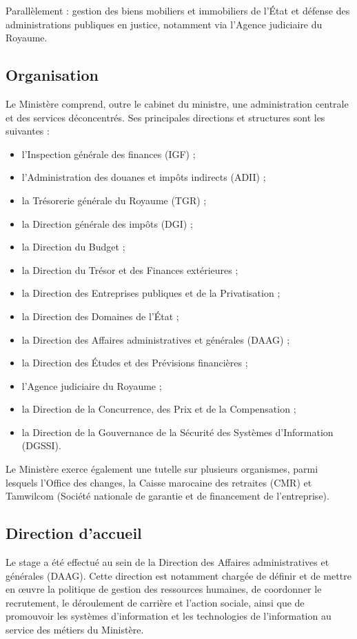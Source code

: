 \begin{onehalfspace}
Parallèlement : gestion des biens mobiliers et immobiliers de l'État et défense des administrations publiques en justice, notamment via l'Agence judiciaire du Royaume.

\subsection{Organisation}

Le Ministère comprend, outre le cabinet du ministre, une administration centrale et des services déconcentrés. Ses principales directions et structures sont les suivantes :

\begin{itemize}
  \item l'Inspection générale des finances (IGF) ;
  \item l'Administration des douanes et impôts indirects (ADII) ;
  \item la Trésorerie générale du Royaume (TGR) ;
  \item la Direction générale des impôts (DGI) ;
  \item la Direction du Budget ;
  \item la Direction du Trésor et des Finances extérieures ;
  \item la Direction des Entreprises publiques et de la Privatisation ;
  \item la Direction des Domaines de l'État ;
  \item la Direction des Affaires administratives et générales (DAAG) ;
  \item la Direction des Études et des Prévisions financières ;
  \item l'Agence judiciaire du Royaume ;
  \item la Direction de la Concurrence, des Prix et de la Compensation ;
  \item la Direction de la Gouvernance de la Sécurité des Systèmes d'Information (DGSSI).
\end{itemize}

Le Ministère exerce également une tutelle sur plusieurs organismes, parmi lesquels l'Office des changes, la Caisse marocaine des retraites (CMR) et Tamwilcom (Société nationale de garantie et de financement de l'entreprise).

\subsection{Direction d'accueil}

Le stage a été effectué au sein de la Direction des Affaires administratives et générales (DAAG). Cette direction est notamment chargée de définir et de mettre en œuvre la politique de gestion des ressources humaines, de coordonner le recrutement, le déroulement de carrière et l'action sociale, ainsi que de promouvoir les systèmes d'information et les technologies de l'information au service des métiers du Ministère.


\end{onehalfspace}
